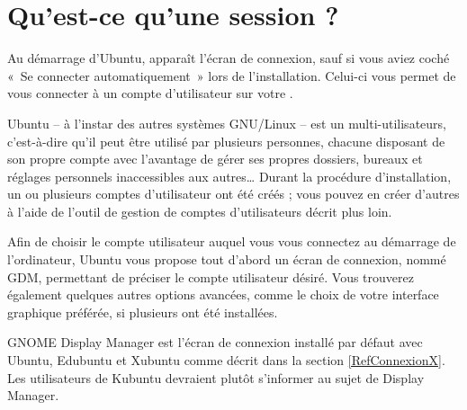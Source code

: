 \section{Qu'est-ce qu'une session ?}
\label{PremiereConnexion}
Au démarrage d'Ubuntu, apparaît l'écran de connexion, sauf si vous aviez coché «~Se connecter automatiquement~» lors de l'installation. Celui-ci vous permet de vous connecter à un compte d'utilisateur sur votre .\par
{}
Ubuntu -- à l'instar des autres systèmes GNU/Linux -- est un  multi-utilisateurs, c'est-à-dire qu'il peut être utilisé par plusieurs personnes, chacune disposant de son propre compte avec l'avantage de gérer ses propres dossiers, bureaux et réglages personnels inaccessibles aux autres\ldots{} Durant la procédure d'installation, un ou plusieurs comptes d'utilisateur ont été créés ; vous pouvez en créer d'autres à l'aide de l'outil de gestion de comptes d'utilisateurs décrit plus loin.\par 
Afin de choisir le compte utilisateur auquel vous vous connectez au démarrage de l'ordinateur, Ubuntu vous propose tout d'abord un écran de connexion, nommé GDM, permettant de préciser le compte utilisateur désiré. Vous trouverez également quelques autres options avancées, comme le choix de votre interface graphique préférée, si plusieurs ont été installées.\par
\begin{nota}
GNOME Display Manager est l'écran de connexion installé par défaut avec Ubuntu, Edubuntu et Xubuntu comme décrit dans la section \ref{RefConnexionX}. Les utilisateurs de Kubuntu devraient plutôt s'informer au sujet de  Display Manager.
\end{nota}
